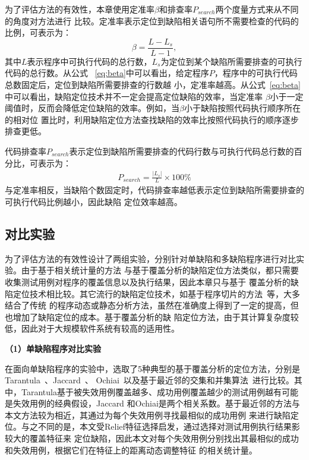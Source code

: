 为了评估方法的有效性，本章使用定准率$\beta$和排查率$P_{search}$两个度量方式来从不同的角度对方法进行
比较。定准率表示定位到缺陷相关语句所不需要检查的代码的比例，可表示为：
\begin{equation}
       \beta = \frac{L-L_s}{L-1},\label{eq:beta}
\end{equation}
其中$L$表示程序中可执行代码的总行数，$L_s$为定位到某个缺陷所需要排查的可执行代码的总行数。从公式
~\eqref{eq:beta}中可以看出，给定程序$P$，程序中的可执行代码总数固定后，定位到缺陷所需要排查的行数越
小，定准率越高。从公式~\eqref{eq:beta}中可以看出，缺陷定位技术并不一定会提高定位缺陷的效率，当定准率
$\beta$小于一定阈值时，反而会降低定位缺陷的效率。例如，当$\beta$小于缺陷按照代码执行顺序所在的相对位
置比时，利用缺陷定位方法查找缺陷的效率比按照代码执行的顺序逐步排查更低。

代码排查率$P_{search}$表示定位到缺陷所需要排查的代码行数与可执行代码总行数的百分比，可表示为：
\begin{eqnarray}
      P_{search}=\frac{|L_s|}{L}\times100\%
\end{eqnarray}
与定准率相反，当缺陷个数固定时，代码排查率越低表示定位到缺陷所需要排查的可执行代码比例越小，因此缺陷
定位效率越高。

\subsection{对比实验}
为了评估方法的有效性设计了两组实验，分别针对单缺陷和多缺陷程序进行对比实验。由于基于相关统计量的方法
与基于覆盖分析的缺陷定位方法类似，都只需要收集测试用例对程序的覆盖信息以及执行结果，因此本章只与基于
覆盖分析的缺陷定位技术相比较。其它流行的缺陷定位技术，如基于程序切片的方法~\cite{}等，大多结合了传统
的程序动态或静态分析方法，虽然在准确度上得到了一定的提高，但也增加了缺陷定位的成本。基于覆盖分析的缺
陷定位方法，由于其计算复杂度较低，因此对于大规模软件系统有较高的适用性。

\textbf{（1）单缺陷程序对比实验}

在面向单缺陷程序的实验中，选取了5种典型的基于覆盖分析的定位方法，分别是
Tarantula~\cite{jones2005empirical}、Jaccard~\cite{abreu2007accuracy}、
Ochiai~\cite{abreu2007accuracy}以及基于最近邻的交集和并集算法~\cite{renieres2003fault}进行比较。其
中，Tarantula基于被失效用例覆盖越多、成功用例覆盖越少的测试用例越有可能是失效用例的经典假设，Jaccard
和Ochiai是两个相关系数。基于最近邻的方法与本文方法较为相近，其通过为每个失效用例寻找最相似的成功用例
来进行缺陷定位。与之不同的是，本文受Relief特征选择启发，通过选择对测试用例执行结果影较大的覆盖特征来
定位缺陷，因此本文对每个失效用例分别找出其最相似的成功和失效用例，根据它们在特征上的距离动态调整特征
的相关统计量。

